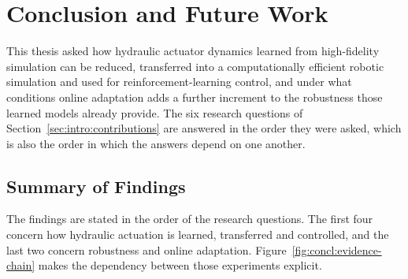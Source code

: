 \chapter{Conclusion and Future Work}
\label{chap:conclusion}
\fancyhead[RE]{\headfont\nouppercase{\leftmark}}

This thesis asked how hydraulic actuator dynamics learned from high-fidelity
simulation can be reduced, transferred into a computationally efficient robotic
simulation and used for reinforcement-learning control, and under what
conditions online adaptation adds a further increment to the robustness those
learned models already provide. The six research questions of
Section~\ref{sec:intro:contributions} are answered in the order they were
asked, which is also the order in which the answers depend on one another.

\section{Summary of Findings}
\label{sec:concl:findings}

The findings are stated in the order of the research questions. The first four
concern how hydraulic actuation is learned, transferred and controlled, and the
last two concern robustness and online adaptation. Figure~\ref{fig:concl:evidence-chain}
makes the dependency between those experiments explicit.

